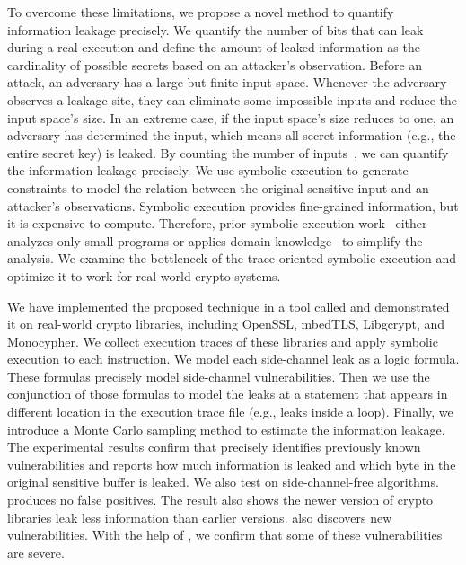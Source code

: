 To overcome these limitations, we propose a novel method to quantify information
leakage precisely. We quantify the number of bits that can leak during a real
execution and define the amount of leaked information as the cardinality of
possible secrets based on an attacker's observation. Before an attack, an adversary has a large but finite input space.
Whenever the adversary observes a leakage site, they can eliminate some impossible
inputs and reduce the input space's size. In an extreme case, if the input space's size reduces to one, an adversary has determined the input, which means all secret information (e.g., the entire secret key) is
leaked. By counting the number of inputs~\cite{10.1007/11499107_24}, we can quantify the information leakage precisely.
We use symbolic execution to generate constraints to model the relation
between the original sensitive input and an attacker's observations.
Symbolic execution provides fine-grained information, but it is expensive
to compute. Therefore, prior symbolic
execution work~\cite{203878,236338,Brotzman19Casym} either analyzes only
small programs or applies domain knowledge~\cite{203878} to simplify the analysis. We
examine the bottleneck of the trace-oriented symbolic execution and optimize it
to work for real-world crypto-systems.

We have implemented the proposed technique in a tool called \tool{} and demonstrated
it on real-world crypto libraries, including OpenSSL,
mbedTLS, Libgcrypt, and Monocypher.
We collect execution traces of these libraries and apply
symbolic execution to each instruction. We model
each side-channel leak as a logic formula. These
formulas precisely model side-channel vulnerabilities.
Then we use the conjunction of those formulas to model the
leaks at a statement that appears in different location in
the execution trace file (e.g., leaks inside a loop).
Finally, we introduce a Monte Carlo sampling method to estimate
the information leakage.
The experimental results confirm
that \tool{} precisely identifies previously known vulnerabilities and
reports how much information is leaked and which byte in the original sensitive
buffer is leaked. We also test \tool{} on side-channel-free algorithms.
\tool{} produces no false positives.
The result also shows the newer version of crypto libraries leak less information
than earlier versions.
\tool{} also discovers new vulnerabilities. With the help of \tool{},
we confirm that some of these vulnerabilities are severe.




